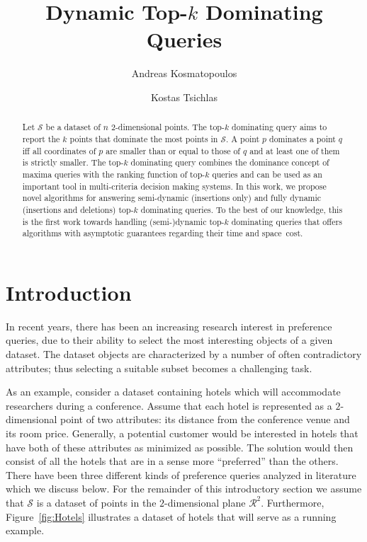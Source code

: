 \documentclass{llncs}
\begin{document}
\mainmatter              
\title{Dynamic Top-$k$ Dominating Queries}
  \author{Andreas Kosmatopoulos \and Kostas Tsichlas}
 

\maketitle              
\begin{abstract}
Let $\mathcal{S}$ be a dataset of $n$ $2$-dimensional points. The top-$k$ dominating query aims to report the $k$ points that dominate the most points in $\mathcal{S}$. A point $p$ dominates a point $q$ iff all coordinates of $p$ are smaller than or equal to those of $q$ and at least one of them is strictly smaller. The top-$k$ dominating query combines the dominance concept of maxima queries with the ranking function of top-$k$ queries and can be used as an important tool in multi-criteria decision making systems. In this work, we propose novel algorithms for answering semi-dynamic (insertions only) and fully dynamic (insertions and deletions) top-$k$ dominating queries. To the best of our knowledge, this is the first work towards handling (semi-)dynamic top-$k$ dominating queries that offers algorithms with asymptotic guarantees regarding their time and space~cost.
\end{abstract}

\section{Introduction} \label{section:Introduction}
In recent years, there has been an increasing research interest in preference queries, due to their ability to select the most interesting objects of a given dataset. The dataset objects are characterized by a number of often contradictory attributes; thus selecting a suitable subset becomes a challenging task.

As an example, consider a dataset containing hotels which will accommodate researchers during a conference. Assume that each hotel is represented as a $2$-dimensional point of two attributes: its distance from the conference venue and its room price. Generally, a potential customer would be interested in hotels that have both of these attributes as minimized as possible. The solution would then consist of all the hotels that are in a sense more ``preferred'' than the others. There have been three different kinds of preference queries analyzed in literature which we discuss below. For the remainder of this introductory section we assume that $\mathcal{S}$ is a dataset of points in the $2$-dimensional plane $\mathcal{R}^2$. Furthermore, Figure~\ref{fig:Hotels} illustrates a dataset of hotels that will serve as a running example.
\end{document}
